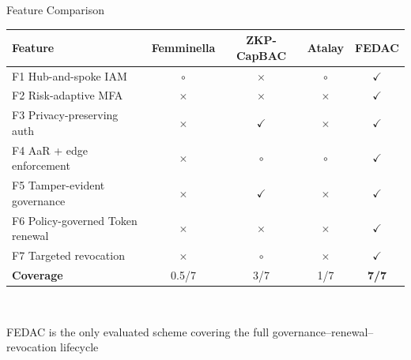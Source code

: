 \documentclass[aspectratio=169,11pt]{beamer}
\newcommand{\pinkbanner}[1]{%
  \begin{center}
  \begin{tcolorbox}[colback=fedacGray,colframe=fedacGray,
                    boxrule=0pt,arc=1mm,left=10pt,right=10pt,top=3pt,bottom=3pt,
                    width=0.96\linewidth,
                    borderline west={2pt}{0pt}{fedacTeal}]
  \footnotesize\color{fedacNavyD}#1
  \end{tcolorbox}
  \end{center}}
\begin{document}
\begin{frame}{Feature Comparison}
\vspace{4pt}
\centering
\footnotesize
\setlength{\tabcolsep}{6pt}
\renewcommand{\arraystretch}{1.18}
\begin{tabular}{l c c c c}
\toprule
\rowcolor{fedacGray}\textbf{Feature} & \textbf{Femminella} & \textbf{ZKP-CapBAC} & \textbf{Atalay} & \textbf{FEDAC}\\
\midrule
F1 Hub-and-spoke IAM            & $\circ$ & $\times$  & $\circ$ & $\checkmark$\\
F2 Risk-adaptive MFA            & $\times$& $\times$  & $\times$& $\checkmark$\\
F3 Privacy-preserving auth      & $\times$& $\checkmark$ & $\times$& $\checkmark$\\
F4 AaR + edge enforcement       & $\times$& $\circ$  & $\circ$ & $\checkmark$\\
F5 Tamper-evident governance    & $\times$& $\checkmark$ & $\times$& $\checkmark$\\
F6 Policy-governed Token renewal      & $\times$& $\times$  & $\times$& $\checkmark$\\
F7 Targeted revocation          & $\times$& $\circ$  & $\times$& $\checkmark$\\
\midrule
\textbf{Coverage} & 0.5/7 & 3/7 & 1/7 & \textbf{7/7}\\
\bottomrule
\end{tabular}\\[6pt]
\pinkbanner{FEDAC is the only evaluated scheme covering the full governance--renewal--revocation lifecycle}
\end{frame}
\end{document}
